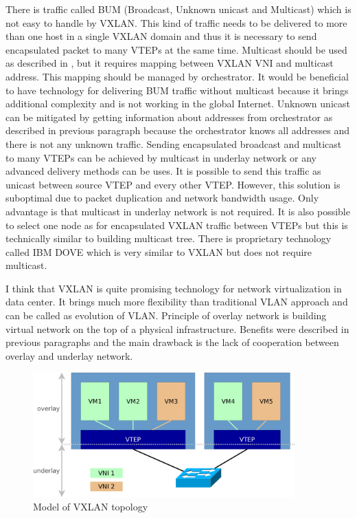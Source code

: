 There is traffic called \Ac{BUM} (Broadcast, Unknown unicast and Multicast) which is not easy to handle by \Ac{VXLAN}. This kind of traffic needs to be delivered to more than one host in a single \Ac{VXLAN} domain and thus it is necessary to send encapsulated packet to many \Ac{VTEP}s at the same time. Multicast should be used as described in \cite{rfc7348}, but it requires mapping between \Ac{VXLAN} \Ac{VNI} and multicast address. This mapping should be managed by orchestrator. 
It would be beneficial to have technology for delivering \Ac{BUM} traffic without multicast because it brings additional complexity and is not working in the global Internet. Unknown unicast can be mitigated by getting information about addresses from orchestrator as described in previous paragraph because the orchestrator knows all addresses and there is not any unknown traffic. 
Sending encapsulated broadcast and multicast to many \Ac{VTEP}s can be achieved by multicast in underlay network or any advanced delivery methods can be uses. It is possible to send this traffic as unicast between source \Ac{VTEP} and every other \Ac{VTEP}. However, this solution is suboptimal due to packet duplication and network bandwidth usage. Only advantage is that multicast in underlay network is not required. It is also possible to select one node as  for encapsulated \Ac{VXLAN} traffic between \Ac{VTEP}s but this is technically similar to building multicast tree.
There is proprietary technology called IBM DOVE which is very similar to \Ac{VXLAN} but does not require multicast.


I think that \Ac{VXLAN} is quite promising technology for network virtualization in data center. It brings much more flexibility than traditional \Ac{VLAN} approach and can be called as evolution of \Ac{VLAN}. Principle of overlay network is building virtual network on the top of a physical infrastructure. Benefits were described in previous paragraphs and the main drawback is the lack of cooperation between overlay and underlay network. 

\begin{figure}[htb]
	\begin{center}
	\includegraphics[width=0.9\textwidth]{vxlan.png}
	\end{center}
	\caption{Model of VXLAN topology}
	\label{img:vxlan-topology}
\end{figure}

